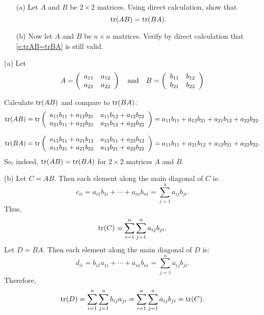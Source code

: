 \documentclass{ximera}
\begin{document}
\begin{exercise} \label{c6.4.3}
\begin{itemize}
\item[(a)] Let $A$ and $B$ be $2\times 2$ matrices. Using direct
calculation, show that
\begin{equation}  \label{e:trAB=trBA}
{\rm tr}(AB) = {\rm tr}(BA).
\end{equation}
\item[(b)] Now let $A$ and $B$ be $n\times n$ matrices. Verify
by direct calculation that \eqref{e:trAB=trBA} is still valid.
\end{itemize}

\begin{solution}

(a) Let
\[
A = \left(\begin{array}{rr} a_{11} & a_{12}\\ a_{21} &a_{22}\end{array}\right) \quad\mbox{and}\quad
B = \left(\begin{array}{rr} b_{11} & b_{12}\\ b_{21} &b_{22}\end{array}\right)
\]

Calculate ${\rm tr}(AB)$ and compare to ${\rm tr}(BA)$:
\[
{\rm tr}(AB) =
{\rm tr}\left(\begin{array}{rr} a_{11}b_{11} + a_{12}b_{21} & a_{11}b_{12} + a_{12}b_{22}\\ a_{21}b_{11} + a_{22}b_{21} &a_{21}b_{12} + a_{22}b_{22}\end{array}\right) =
a_{11}b_{11} + a_{12}b_{21} + a_{21}b_{12} + a_{22}b_{22}.
\]

\[
{\rm tr}(BA) =
{\rm tr}\left(\begin{array}{rr} a_{11}b_{11} + a_{21}b_{12} & a_{12}b_{11} + a_{22}b_{12}\\ a_{11}b_{21} + a_{21}b_{22} &a_{12}b_{21} + a_{22}b_{22}\end{array}\right) =
a_{11}b_{11} + a_{21}b_{12} + a_{12}b_{21} + a_{22}b_{22}.
\]
So, indeed, ${\rm tr}(AB) = {\rm tr}(BA)$ for $2 \times 2$ matrices
$A$ and $B$.

(b) Let $C = AB$.  Then each element along the main diagonal of $C$ is:
\[
c_{ii} = a_{i1}b_{1i} + \cdots + a_{in}b_{ni} =
\sum_{j = 1}^{n} a_{ij}b_{ji}.
\]
Thus,
\[
{\rm tr}(C) = \sum_{i = 1}^{n} \sum_{j = 1}^{n} a_{ij}b_{ji}.
\]
Let $D = BA$.  Then each element along the main diagonal of $D$ is:
\[
d_{ii} = b_{i1}a_{1i} + \cdots + a_{in}b_{ni} =
\sum_{j = 1}^n a_{ij}b_{ji}.
\]
Therefore,
\[
{\rm tr}(D) = \sum_{i = 1}^{n} \sum_{j = 1}^{n} b_{ij}a_{ji}
= \sum_{i = 1}^{n} \sum_{j = 1}^{n} a_{ij}b_{ji} = {\rm tr}(C).
\]

\end{solution}
\end{exercise}
\end{document}
